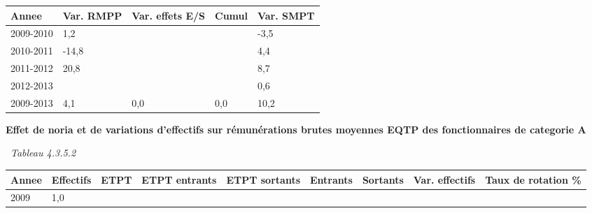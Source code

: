 \begin{longtable}[]{@{}lllll@{}}
\toprule
Annee & Var. RMPP & Var. effets E/S & Cumul & Var. SMPT\tabularnewline
\midrule
\endhead
2009-2010 & 1,2 & & & -3,5\tabularnewline
2010-2011 & -14,8 & & & 4,4\tabularnewline
2011-2012 & 20,8 & & & 8,7\tabularnewline
2012-2013 & & & & 0,6\tabularnewline
2009-2013 & 4,1 & 0,0 & 0,0 & 10,2\tabularnewline
\bottomrule
\end{longtable}

\textbf{Effet de noria et de variations d'effectifs sur rémunérations
brutes moyennes EQTP des fonctionnaires de categorie A}

~\emph{Tableau 4.3.5.2}

\begin{longtable}[]{@{}lllllllll@{}}
\toprule
\begin{minipage}[b]{0.05\columnwidth}\raggedright
Annee\strut
\end{minipage} & \begin{minipage}[b]{0.08\columnwidth}\raggedright
Effectifs\strut
\end{minipage} & \begin{minipage}[b]{0.04\columnwidth}\raggedright
ETPT\strut
\end{minipage} & \begin{minipage}[b]{0.10\columnwidth}\raggedright
ETPT entrants\strut
\end{minipage} & \begin{minipage}[b]{0.10\columnwidth}\raggedright
ETPT sortants\strut
\end{minipage} & \begin{minipage}[b]{0.07\columnwidth}\raggedright
Entrants\strut
\end{minipage} & \begin{minipage}[b]{0.07\columnwidth}\raggedright
Sortants\strut
\end{minipage} & \begin{minipage}[b]{0.11\columnwidth}\raggedright
Var. effectifs\strut
\end{minipage} & \begin{minipage}[b]{0.14\columnwidth}\raggedright
Taux de rotation \%\strut
\end{minipage}\tabularnewline
\midrule
\endhead
\begin{minipage}[t]{0.05\columnwidth}\raggedright
2009\strut
\end{minipage} & \begin{minipage}[t]{0.08\columnwidth}\raggedright
1,0\strut
\end{minipage} & \begin{minipage}[t]{0.04\columnwidth}\raggedright

\end{minipage}
\end{longtable}
